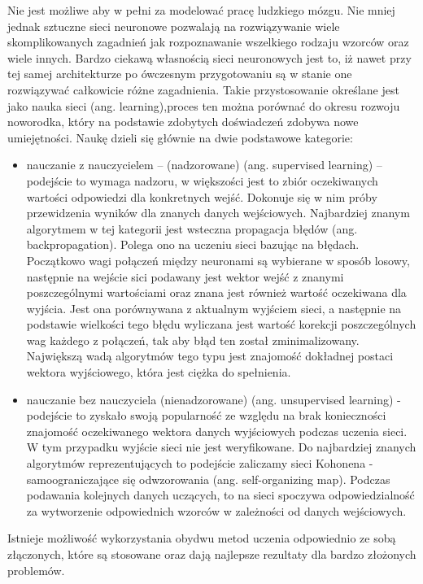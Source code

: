 Nie jest możliwe aby w pełni za modelować pracę ludzkiego mózgu. Nie mniej jednak sztuczne sieci neuronowe pozwalają na rozwiązywanie wiele skomplikowanych zagadnień jak rozpoznawanie wszelkiego rodzaju wzorców oraz wiele innych. Bardzo ciekawą własnością sieci neuronowych jest to, iż nawet przy tej samej architekturze po ówczesnym przygotowaniu są w stanie one rozwiązywać całkowicie różne zagadnienia. Takie przystosowanie określane jest jako nauka sieci (ang. learning),proces ten można porównać do okresu rozwoju noworodka, który na podstawie zdobytych doświadczeń zdobywa nowe umiejętności.
Naukę dzieli się głównie na dwie podstawowe kategorie:
\begin{itemize}
	\item nauczanie z nauczycielem – (nadzorowane) (ang. supervised learning) –  podejście to wymaga nadzoru, w większości jest to zbiór oczekiwanych wartości odpowiedzi dla konkretnych wejść. Dokonuje się w nim próby przewidzenia wyników dla znanych danych wejściowych. Najbardziej znanym algorytmem w tej kategorii jest wsteczna propagacja błędów (ang. backpropagation). Polega ono na uczeniu sieci bazując na błędach. Początkowo wagi połączeń między neuronami są wybierane w sposób losowy, następnie na wejście sici podawany jest wektor wejść z znanymi poszczególnymi wartościami oraz znana jest również wartość oczekiwana dla wyjścia. Jest ona porównywana z aktualnym wyjściem sieci, a następnie na podstawie wielkości tego błędu wyliczana jest wartość korekcji poszczególnych wag każdego z połączeń, tak aby błąd ten został zminimalizowany. Największą wadą algorytmów tego typu jest znajomość dokładnej postaci wektora wyjściowego, która jest ciężka do spełnienia.
	\item nauczanie bez nauczyciela (nienadzorowane) (ang. unsupervised learning) - podejście to zyskało swoją popularność ze względu na brak konieczności znajomość oczekiwanego wektora danych wyjściowych podczas uczenia sieci. W tym przypadku wyjście sieci nie jest weryfikowane. Do najbardziej znanych algorytmów reprezentujących to podejście zaliczamy sieci Kohonena - samoograniczające się odwzorowania (ang. self-organizing map). Podczas podawania kolejnych danych uczących, to na sieci spoczywa odpowiedzialność za wytworzenie odpowiednich wzorców w zależności od danych wejściowych.
\end{itemize}
Istnieje możliwość wykorzystania obydwu metod uczenia odpowiednio ze sobą złączonych, które są stosowane oraz dają najlepsze rezultaty dla bardzo złożonych problemów.
 
